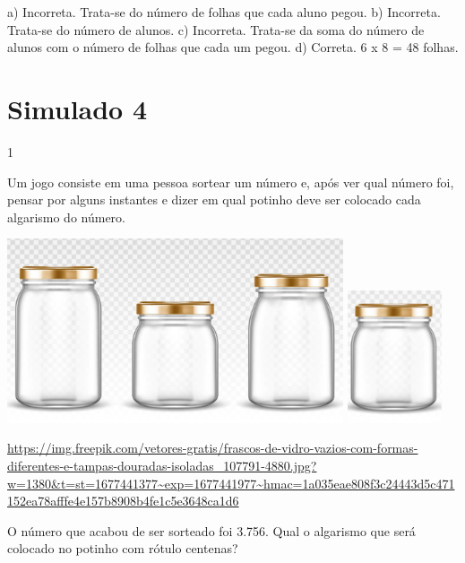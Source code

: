 {\begin{escolha}
{a) Incorreta. Trata-se do número de folhas que cada aluno pegou.
b) Incorreta. Trata-se do número de alunos.
c) Incorreta. Trata-se da soma do número de alunos com o número de folhas que cada um pegou.
d) Correta. 6 x 8 = 48 folhas.

\chapter{Simulado 4}

\num{1}

Um jogo consiste em uma pessoa sortear um número e, após ver qual número foi, pensar por alguns instantes e dizer em qual potinho deve ser colocado cada algarismo do número.

\includegraphics[width=3.90833in,height=2.14168in]{media/image129.png}
\includegraphics[width=1.10010in,height=1.54180in]{media/image130.png}


\url{https://img.freepik.com/vetores-gratis/frascos-de-vidro-vazios-com-formas-diferentes-e-tampas-douradas-isoladas_107791-4880.jpg?w=1380\&t=st=1677441377~exp=1677441977~hmac=1a035eae808f3c24443d5c471152ea78afffe4e157b8908b4fe1c5e3648ca1d6}

O número que acabou de ser sorteado foi 3.756. Qual o algarismo que será colocado no potinho com rótulo centenas?

\begin{escolha}


\end{escolha}}
\end{escolha}}
